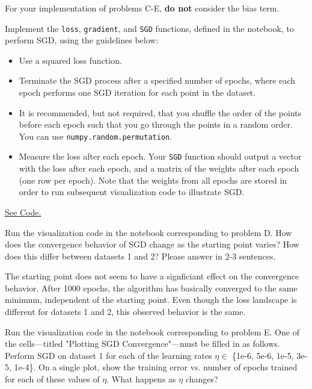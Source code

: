 For your implementation of problems C-E, \textbf{do not} consider the bias term.

\begin{problem}[8]
  Implement the \texttt{loss}, \texttt{gradient}, and \texttt{SGD} functions, defined in the notebook, to perform SGD, using the guidelines below:

  \begin{itemize}
    \item Use a squared loss function.
    \item Terminate the SGD process after a specified number of epochs, where each epoch performs one SGD iteration for each point in the dataset.
    \item It is recommended, but not required, that you shuffle the order of the points before each epoch such that you go through the points in a random order. You can use \texttt{numpy.random.permutation}.
    \item Measure the loss after each epoch. Your \texttt{SGD} function should output a vector with the loss after each epoch, and a matrix of the weights after each epoch (one row per epoch). Note that the weights from all epochs are stored in order to run subsequent visualization code to illustrate SGD.
  \end{itemize}
\end{problem}
\begin{solution}
  \href{https://colab.research.google.com/drive/1pm5bMibVysdYZKvMpoppxPSwm66tdaUn?usp=sharing}{See Code.} 
\end{solution}

\begin{problem}[2]
  Run the visualization code in the notebook corresponding to problem D. How does the convergence behavior of SGD change as the starting point varies? How does this differ between datasets 1 and 2? Please answer in 2-3 sentences.
\end{problem}
\begin{solution}
  The starting point does not seem to have a signficiant effect on the convergence behavior. After 1000 epochs, the algorithm has basically converged to the same minimum, independent of the starting point. Even though the loss landscape is different for datasets 1 and 2, this observed behavior is the same. 
\end{solution}

\begin{problem}[6]
  Run the visualization code in the notebook corresponding to problem E. One of the cells---titled "Plotting SGD Convergence"---must be filled in as follows. Perform SGD on dataset 1 for each of the learning rates $\eta \in$ \{1e-6, 5e-6, 1e-5, 3e-5, 1e-4\}. On a single plot, show the training error vs. number of epochs trained for each of these values of $\eta$. What happens as $\eta$ changes?
\end{problem}

